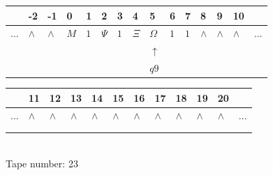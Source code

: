 \documentclass[11pt]{article}
\begin{document}
\begin{table}[H]
\centering
\begin{tabular}{lllllllllllllll}
 & -2 & -1 & 0 & 1 & 2 & 3 & 4 & 5 & 6 & 7 & 8 & 9 & 10 & \\
\hline
$...$ & \multicolumn{1}{|l|}{$\wedge$} & \multicolumn{1}{|l|}{$\wedge$} & \multicolumn{1}{|l|}{$M$} & \multicolumn{1}{|l|}{$1$} & \multicolumn{1}{|l|}{$\Psi$} & \multicolumn{1}{|l|}{$1$} & \multicolumn{1}{|l|}{$\Xi$} & \multicolumn{1}{|l|}{$\Omega$} & \multicolumn{1}{|l|}{$1$} & \multicolumn{1}{|l|}{$1$} & \multicolumn{1}{|l|}{$\wedge$} & \multicolumn{1}{|l|}{$\wedge$} & \multicolumn{1}{|l|}{$\wedge$} & $...$\\
\hline
&  &  &  &  &  &  &  & $\uparrow$ &  &  &  &  &  &  \\
&  &  &  &  &  &  &  & $ q9 $ &  &  &  &  &  &  \\
\end{tabular}
\begin{tabular}{llllllllllll}
 & 11 & 12 & 13 & 14 & 15 & 16 & 17 & 18 & 19 & 20 & \\
\hline
$...$ & \multicolumn{1}{|l|}{$\wedge$} & \multicolumn{1}{|l|}{$\wedge$} & \multicolumn{1}{|l|}{$\wedge$} & \multicolumn{1}{|l|}{$\wedge$} & \multicolumn{1}{|l|}{$\wedge$} & \multicolumn{1}{|l|}{$\wedge$} & \multicolumn{1}{|l|}{$\wedge$} & \multicolumn{1}{|l|}{$\wedge$} & \multicolumn{1}{|l|}{$\wedge$} & \multicolumn{1}{|l|}{$\wedge$} & $...$\\
\hline
&  &  &  &  &  &  &  &  &  &  &  \\
&  &  &  &  &  &  &  &  &  &  &  \\
\end{tabular}
\\
Tape number: 23
\noindent\makebox[\linewidth]{\hdashrule{\textwidth}{1pt}{1pt}}\end{table}
\clearpage
\end{document}
